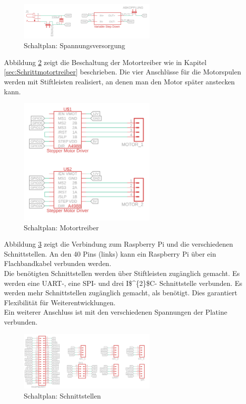 \begin{figure}[H]
	\centering
	\includegraphics[width=0.6\textwidth]{images/Hardware/Schaltplan/Spannung}
	\caption{Schaltplan: Spannungsversorgung}
	\label{spannung}
\end{figure}

Abbildung \ref{driver} zeigt die Beschaltung der Motortreiber wie in Kapitel \ref{sec:Schrittmotortreiber} beschrieben. Die vier Anschlüsse für die Motorspulen werden mit Stiftleisten realisiert, an denen man den Motor später anstecken kann.

\begin{figure}[H]
	\centering
	\includegraphics[width=0.6\textwidth]{images/Hardware/Schaltplan/Driver}
	\caption{Schaltplan: Motortreiber}
	\label{driver}
\end{figure}

Abbildung \ref{schnittstellen} zeigt die Verbindung zum Raspberry Pi und die verschiedenen Schnittstellen. An den 40 Pins (links) kann ein Raspberry Pi über ein Flachbandkabel verbunden werden. \\
Die benötigten Schnittstellen werden über Stiftleisten zugänglich gemacht. Es werden eine \ac{UART}-, eine \ac{SPI}- und drei \ac{I$^{2}$C}- Schnittstelle verbunden. Es werden mehr Schnittstellen zugänglich gemacht, als benötigt. Dies garantiert Flexibilität für Weiterentwicklungen. \\
Ein weiterer Anschluss ist mit den verschiedenen Spannungen der Platine verbunden. 

\begin{figure}[H]
	\centering
	\includegraphics[width=0.6\textwidth]{images/Hardware/Schaltplan/Schnittstellen}
	\caption{Schaltplan: Schnittstellen}
	\label{schnittstellen}
\end{figure}

